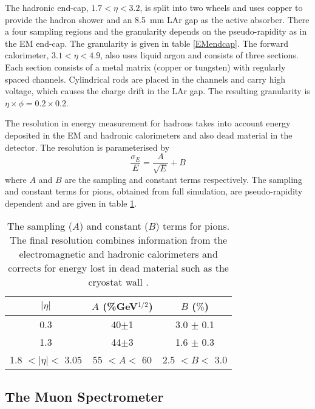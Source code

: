 The hadronic end-cap, $1.7<\eta<3.2$, is split into two wheels and uses copper to provide the hadron shower and an 8.5~mm LAr gap as the active absorber. There a four sampling regions and the granularity   depends on the pseudo-rapidity as in the EM end-cap. The granularity is given in table \ref{EMendcap}. 
The forward calorimeter, $3.1<\eta<4.9$, also uses liquid argon and consists of three sections. Each section consists of a metal matrix (copper or tungsten) with regularly spaced channels. Cylindrical rods are placed in the channels and carry high voltage, which causes the charge drift in the LAr gap. The resulting granularity is $\eta\times\phi=0.2\times0.2$.

The resolution in energy measurement for hadrons takes into account energy deposited in the EM and hadronic calorimeters and also dead material in the detector. The resolution is parameterised \cite{:1999fq:Chapter5} by
\begin{equation}
\frac{\sigma_E}{E} = \frac{A}{\sqrt{E}} + B
\end{equation}
where $A$ and $B$ are the sampling and constant terms respectively. The sampling and constant terms for pions, obtained from full simulation, are pseudo-rapidity dependent and are given in table \ref{hadronres}.

\begin{table}[t]
\begin{center}
\begin{tabular}{|c|c|c|}
\hline
$|\eta|$ & $A$ \small{(\%GeV$^{1/2}$)} & $B$ ($\%$) \\
\hline
0.3 & 40$\pm$1 & 3.0 $\pm$ 0.1 \\
1.3 & 44$\pm$3 & 1.6 $\pm$ 0.3\\
1.8 $< |\eta| <$ 3.05 & 55 $< A <$ 60 & 2.5 $< B <$ 3.0 \\
\hline
\end{tabular}
\end{center}
\caption[The sampling and constant terms for pion energy resolution.]{The sampling ($A$) and constant ($B$) terms for pions. The final resolution combines information from the electromagnetic and hadronic calorimeters and corrects for energy lost in dead material such as the cryostat wall \cite{:1999fq:Chapter5}.}
\label{hadronres}
\end{table}%

\subsection{The Muon Spectrometer}

